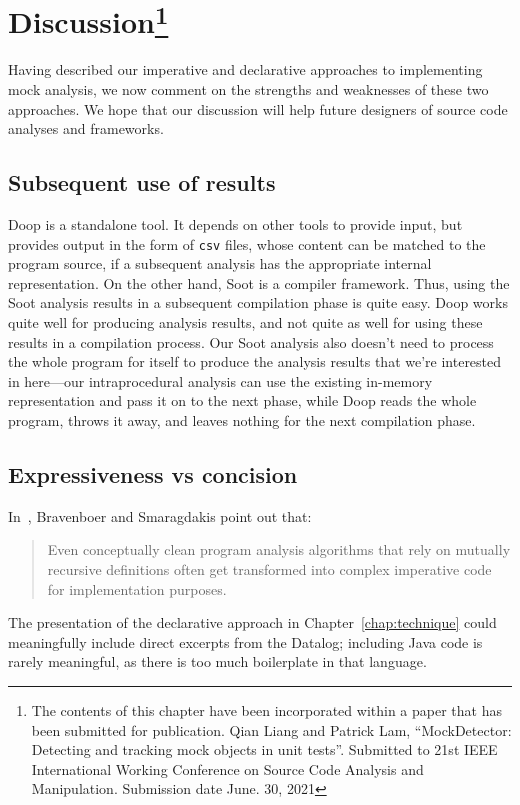 \chapter[Discussion]{Discussion\footnote{The contents of this 
		chapter have been incorporated within a paper that has been submitted for publication. Qian Liang and Patrick Lam, “MockDetector: Detecting and tracking mock objects in unit tests”.
		Submitted to 21st IEEE International Working Conference on 
		Source Code Analysis and Manipulation. Submission date June. 30, 2021}}
\label{chap:discussion}

Having described our imperative and declarative approaches to implementing mock analysis, we now comment on the strengths and weaknesses of these two approaches. We hope that our discussion will help future designers of source code analyses and frameworks.

\section{Subsequent use of results} 

Doop is a standalone tool. It depends on other tools to provide input, but provides output in the form of \texttt{csv} files, whose content can be matched to the program source, if a subsequent analysis has the appropriate internal representation. On the other hand, Soot is a compiler framework. Thus, using the Soot analysis results in a subsequent compilation phase is quite easy. Doop works quite well for producing analysis results, and not quite as well for using these results in a compilation process. Our Soot analysis also doesn't need to process the whole program for itself to produce the analysis results that we're interested in here---our intraprocedural analysis can use the existing in-memory representation and pass it on to the next phase, while Doop reads the whole program, throws it away, and leaves nothing for the next compilation phase. 

\section{Expressiveness vs concision}

In~\cite{bravenboer09:_stric_declar_specif_sophis_point_analy}, Bravenboer and Smaragdakis point out that:
\begin{quote}
	Even conceptually clean program analysis algorithms that
	rely on mutually recursive definitions often get transformed
	into complex imperative code for implementation purposes.
\end{quote}
The presentation of the declarative approach in Chapter~\ref{chap:technique} could meaningfully include direct excerpts from the Datalog; including Java code is rarely meaningful, as there is too much boilerplate in that language.

